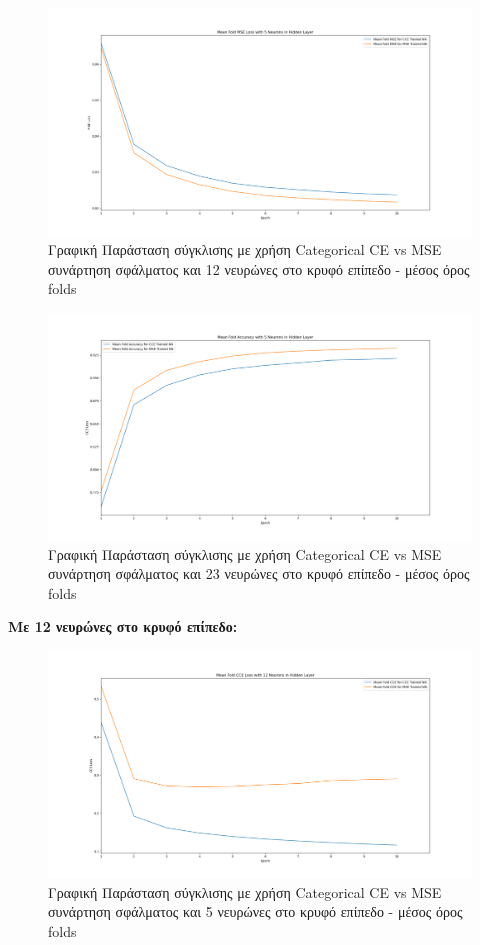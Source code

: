 \documentclass[12pt,a4paper]{article}
\begin{document}
\begin{figure}[H]
	\includegraphics[width=\textwidth]{11. CCE vs MSE - MSE Loss - 5 Neurons - Mean.png}
	\caption{Γραφική Παράσταση σύγκλισης με χρήση Categorical CE vs MSE συνάρτηση σφάλματος και 12 νευρώνες στο κρυφό επίπεδο - μέσος όρος folds}
\end{figure}

\begin{figure}[H]
	\includegraphics[width=\textwidth]{12. CCE vs MSE - Accuracy - 5 Neurons - Mean.png}
	\caption{Γραφική Παράσταση σύγκλισης με χρήση Categorical CE vs MSE συνάρτηση σφάλματος και 23 νευρώνες στο κρυφό επίπεδο - μέσος όρος folds}
\end{figure}

\textbf{Με 12 νευρώνες στο κρυφό επίπεδο:}

\begin{figure}[H]
	\includegraphics[width=\textwidth]{13. CCE vs MSE - CCE Loss - 12 Neurons - Mean.png}
	\caption{Γραφική Παράσταση σύγκλισης με χρήση Categorical CE vs MSE συνάρτηση σφάλματος και 5 νευρώνες στο κρυφό επίπεδο - μέσος όρος folds}
\end{figure}
\end{document}
